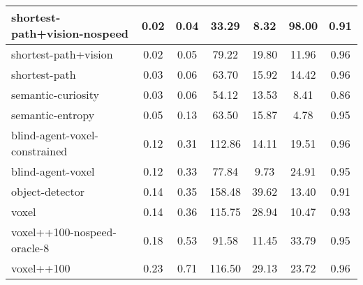 \begin{sidewaystable}
\begin{longtable}{|l|c|c|c|c|c|c|}
shortest-path+vision-nospeed & {\cellcolor[HTML]{EBF2F0}} \color[HTML]{000000} 0.02 & {\cellcolor[HTML]{EBF2F0}} \color[HTML]{000000} 0.04 & {\cellcolor[HTML]{EBF2F0}} \color[HTML]{000000} 33.29 & 8.32 & 98.00 & 0.91 \\ \hline
shortest-path+vision & {\cellcolor[HTML]{E9F1EF}} \color[HTML]{000000} 0.02 & {\cellcolor[HTML]{EBF2F0}} \color[HTML]{000000} 0.05 & {\cellcolor[HTML]{B4D8D0}} \color[HTML]{000000} 79.22 & 19.80 & 11.96 & 0.96 \\ \hline
shortest-path & {\cellcolor[HTML]{E8F1EF}} \color[HTML]{000000} 0.03 & {\cellcolor[HTML]{EAF2F0}} \color[HTML]{000000} 0.06 & {\cellcolor[HTML]{C7E1DB}} \color[HTML]{000000} 63.70 & 15.92 & 14.42 & 0.96 \\ \hline
semantic-curiosity & {\cellcolor[HTML]{E8F1EE}} \color[HTML]{000000} 0.03 & {\cellcolor[HTML]{E9F1EF}} \color[HTML]{000000} 0.06 & {\cellcolor[HTML]{D2E6E2}} \color[HTML]{000000} 54.12 & 13.53 & 8.41 & 0.86 \\ \hline
semantic-entropy & {\cellcolor[HTML]{DFEDE9}} \color[HTML]{000000} 0.05 & {\cellcolor[HTML]{E5EFED}} \color[HTML]{000000} 0.13 & {\cellcolor[HTML]{C7E1DB}} \color[HTML]{000000} 63.50 & 15.87 & 4.78 & 0.95 \\ \hline
blind-agent-voxel-constrained & {\cellcolor[HTML]{C9E2DC}} \color[HTML]{000000} 0.12 & {\cellcolor[HTML]{D8E9E5}} \color[HTML]{000000} 0.31 & {\cellcolor[HTML]{8CC4B9}} \color[HTML]{000000} 112.86 & 14.11 & 19.51 & 0.96 \\ \hline
blind-agent-voxel & {\cellcolor[HTML]{CBE3DD}} \color[HTML]{000000} 0.12 & {\cellcolor[HTML]{D6E8E4}} \color[HTML]{000000} 0.33 & {\cellcolor[HTML]{B6D8D1}} \color[HTML]{000000} 77.84 & 9.73 & 24.91 & 0.95 \\ \hline
object-detector & {\cellcolor[HTML]{C2DFD9}} \color[HTML]{000000} 0.14 & {\cellcolor[HTML]{D5E7E3}} \color[HTML]{000000} 0.35 & {\cellcolor[HTML]{55AA99}} \color[HTML]{F1F1F1} 158.48 & 39.62 & 13.40 & 0.91 \\ \hline
voxel & {\cellcolor[HTML]{C4E0DA}} \color[HTML]{000000} 0.14 & {\cellcolor[HTML]{D4E7E3}} \color[HTML]{000000} 0.36 & {\cellcolor[HTML]{88C3B7}} \color[HTML]{000000} 115.75 & 28.94 & 10.47 & 0.93 \\ \hline
voxel++100-nospeed-oracle-8 & {\cellcolor[HTML]{B8DAD3}} \color[HTML]{000000} 0.18 & {\cellcolor[HTML]{C7E1DB}} \color[HTML]{000000} 0.53 & {\cellcolor[HTML]{A5D1C8}} \color[HTML]{000000} 91.58 & 11.45 & 33.79 & 0.95 \\ \hline
voxel++100 & {\cellcolor[HTML]{A6D1C8}} \color[HTML]{000000} 0.23 & {\cellcolor[HTML]{BADBD4}} \color[HTML]{000000} 0.71 & {\cellcolor[HTML]{87C2B6}} \color[HTML]{000000} 116.50 & 29.13 & 23.72 & 0.96 \\ \hline

\end{longtable}
\end{sidewaystable}
